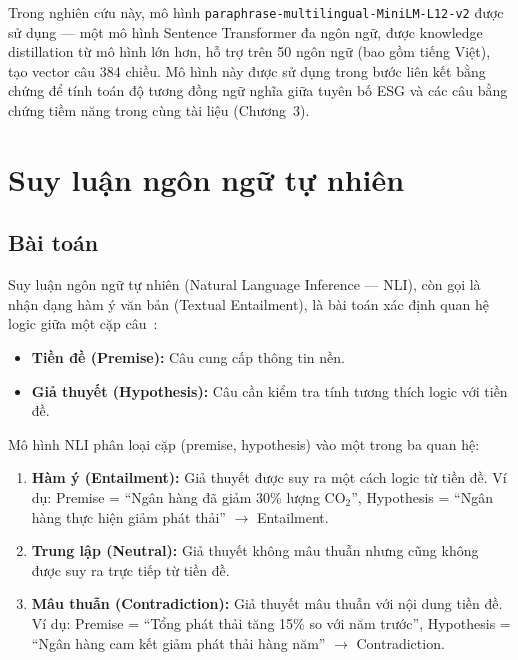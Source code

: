 Trong nghiên cứu này, mô hình \texttt{paraphrase-multilingual-MiniLM-L12-v2} được sử dụng --- một mô hình Sentence Transformer đa ngôn ngữ, được knowledge distillation từ mô hình lớn hơn, hỗ trợ trên 50 ngôn ngữ (bao gồm tiếng Việt), tạo vector câu 384 chiều. Mô hình này được sử dụng trong bước liên kết bằng chứng để tính toán độ tương đồng ngữ nghĩa giữa tuyên bố ESG và các câu bằng chứng tiềm năng trong cùng tài liệu (Chương~3).


\section{Suy luận ngôn ngữ tự nhiên}
\label{sec:nli}

\subsection{Bài toán}
\label{subsec:nli_task}

Suy luận ngôn ngữ tự nhiên (Natural Language Inference --- NLI), còn gọi là nhận dạng hàm ý văn bản (Textual Entailment), là bài toán xác định quan hệ logic giữa một cặp câu~\cite{bowman2015large}:

\begin{itemize}
    \item \textbf{Tiền đề (Premise):} Câu cung cấp thông tin nền.
    \item \textbf{Giả thuyết (Hypothesis):} Câu cần kiểm tra tính tương thích logic với tiền đề.
\end{itemize}

\noindent Mô hình NLI phân loại cặp (premise, hypothesis) vào một trong ba quan hệ:

\begin{enumerate}
    \item \textbf{Hàm ý (Entailment):} Giả thuyết được suy ra một cách logic từ tiền đề. Ví dụ: Premise = ``Ngân hàng đã giảm 30\% lượng CO$_2$'', Hypothesis = ``Ngân hàng thực hiện giảm phát thải'' $\rightarrow$ Entailment.
    \item \textbf{Trung lập (Neutral):} Giả thuyết không mâu thuẫn nhưng cũng không được suy ra trực tiếp từ tiền đề.
    \item \textbf{Mâu thuẫn (Contradiction):} Giả thuyết mâu thuẫn với nội dung tiền đề. Ví dụ: Premise = ``Tổng phát thải tăng 15\% so với năm trước'', Hypothesis = ``Ngân hàng cam kết giảm phát thải hàng năm'' $\rightarrow$ Contradiction.
\end{enumerate}

